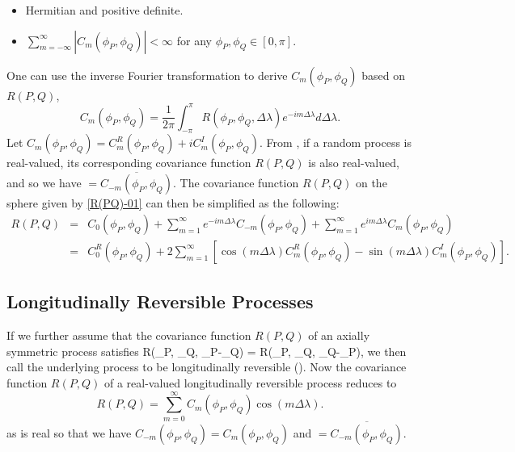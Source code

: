 		\begin{itemize}
			\item Hermitian and positive definite.
			\item $\sum_{m = -\infty}^{\infty}|C_m(\phi_P,\phi_Q)|<\infty$ for any $\phi_P, \phi_Q \in [0, \pi]$.
		\end{itemize}
One can use the inverse Fourier transformation to derive $C_m(\phi_P, \phi_Q)$ based on $R(P,Q)$, 				
		\[
			C_m(\phi_P, \phi_Q) = \frac{1}{2\pi}\int_{-\pi}^{\pi} R(\phi_P, \phi_Q, \Delta\lambda)e^{-im\Delta\lambda} d\Delta\lambda. 
        \]
Let $C_m(\phi_P, \phi_Q) = C_m^R(\phi_P, \phi_Q) + i C_m^I(\phi_P, \phi_Q)$. From \cite{Huang2012}, if a random process is real-valued, its corresponding covariance function $R(P,Q)$ is also real-valued, and so we have \Cm $= \overline{C_{-m}(\phi_P,\phi_Q)}$. The covariance function $R(P,Q)$ on the sphere given by \eqref{R(PQ)-01} can then be simplified as the following:
			\begin{eqnarray*}
				R(P,Q) &=& C_0(\phi_P,\phi_Q) + \sum_{m=1}^{\infty} e^{-im\Delta\lambda}C_{-m}(\phi_P,\phi_Q) +  \sum_{m=1}^{\infty} e^{im\Delta\lambda}C_m(\phi_P,\phi_Q) \\
				&=& C_{0}^{R}(\phi_P,\phi_Q)+2 \sum_{m=1}^{\infty}[\cos(m\Delta\lambda)C_{m}^{R}(\phi_P,\phi_Q)-\sin(m\Delta\lambda)C_{m}^{I}(\phi_P,\phi_Q)].
			\end{eqnarray*}
			
			
			\subsection{Longitudinally Reversible Processes}
If we further assume that the covariance function $R(P, Q)$ of an axially symmetric process satisfies
			\beq
			R(\phi_P, \phi_Q, \lambda_P-\lambda_Q) = R(\phi_P, \phi_Q, \lambda_Q-\lambda_P),
			\eeq
we then call the underlying process to be longitudinally reversible (\cite{Stein2007}). Now the covariance function $R(P, Q)$ of a real-valued longitudinally reversible process reduces to			
			\[
				R(P,Q) = \sum_{m=0}^{\infty} C_m(\phi_P,\phi_Q)\cos(m\Delta\lambda).
			\]
as \Cm is real so that we have $C_{-m}(\phi_P,\phi_Q)=C_m(\phi_P,\phi_Q)$  and \Cm $= \overline{C_{-m}(\phi_P,\phi_Q)}$.

